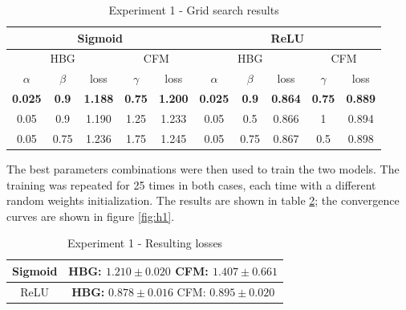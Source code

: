 \begin{table}[htbp]
    \begin{adjustwidth}{-2cm}{-2cm}
        \centering
        \begin{tabular}{|c c c|c c|c c c|c c|}
            \hline
            \multicolumn{5}{|c|}{Sigmoid} & \multicolumn{5}{c|}{ReLU} \\
            \hline
            \multicolumn{3}{|c|}{HBG} & \multicolumn{2}{c|}{CFM} & \multicolumn{3}{c|}{HBG} & \multicolumn{2}{c|}{CFM} \\
            \hline
            $\alpha$ & $\beta$ & loss & $\gamma$ & loss & $\alpha$ & $\beta$ & loss & $\gamma$ & loss \\
            \hline
            \textbf{0.025} & \textbf{0.9} & \textbf{1.188} & \textbf{0.75} & \textbf{1.200} & \textbf{0.025} & \textbf{0.9} & \textbf{0.864} & \textbf{0.75} & \textbf{0.889} \\
            0.05 & 0.9 & 1.190 & 1.25 & 1.233 & 0.05 & 0.5 & 0.866 & 1 & 0.894 \\
            0.05 & 0.75 & 1.236 & 1.75 & 1.245 & 0.05 & 0.75 & 0.867 & 0.5 & 0.898 \\
            \hline
        \end{tabular}
    \end{adjustwidth}
    \caption{Experiment 1 - Grid search results}
    \label{tab:1_gsr}
\end{table}

The best parameters combinations were then used to train the two models. The training was repeated for 25 times in both cases, each time with a different random weights initialization. The results are shown in table \ref{tab:1_r}; the convergence curves are shown in figure \ref{fig:h1}.

\begin{table}[htbp]
    \centering
    \begin{tabular}{|c|c|}
        \hline
        Sigmoid & \makecell{\textbf{HBG:} $\mathbf{1.210 \pm 0.020}$ \\ CFM: $1.407 \pm 0.661$} \\
        \hline
        ReLU & \makecell{\textbf{HBG:} $\mathbf{0.878 \pm 0.016}$ \\ CFM: $0.895 \pm 0.020$} \\
        \hline
    \end{tabular}
    \caption{Experiment 1 - Resulting losses}
    \label{tab:1_r}
\end{table}

